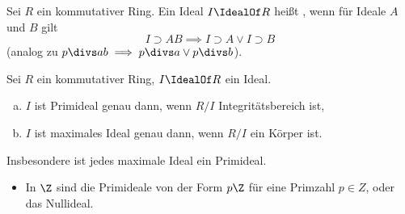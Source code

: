 \begin{df*}
	Sei $R$ ein kommutativer Ring.
	Ein Ideal $I \IdealOf R$ heißt , wenn für Ideale $A$ und $B$ gilt
	\[
		I \supset A B \implies I \supset A \lor I \supset B
	\]
	(analog zu $p \divs ab \implies p\divs a \lor p \divs b$).
\end{df*}

\begin{lem} \label{8.13}
	Sei $R$ ein kommutativer Ring, $I \IdealOf R$ ein Ideal.
	\begin{enumerate}[a)]
		\item
			$I$ ist Primideal genau dann, wenn $R / I$ Integritätsbereich ist,
		\item
			$I$ ist maximales Ideal genau dann, wenn $R / I$ ein Körper ist.
	\end{enumerate}
	Insbesondere ist jedes maximale Ideal ein Primideal.
	\begin{note}
	\end{note}
\end{lem}

\begin{nt} \label{8.14}
	\begin{itemize}
		\item
			In $\Z$ sind die Primideale von der Form $p\Z$ für eine Primzahl $p \in Z$, oder das Nullideal.
	\end{itemize}
\end{nt}



